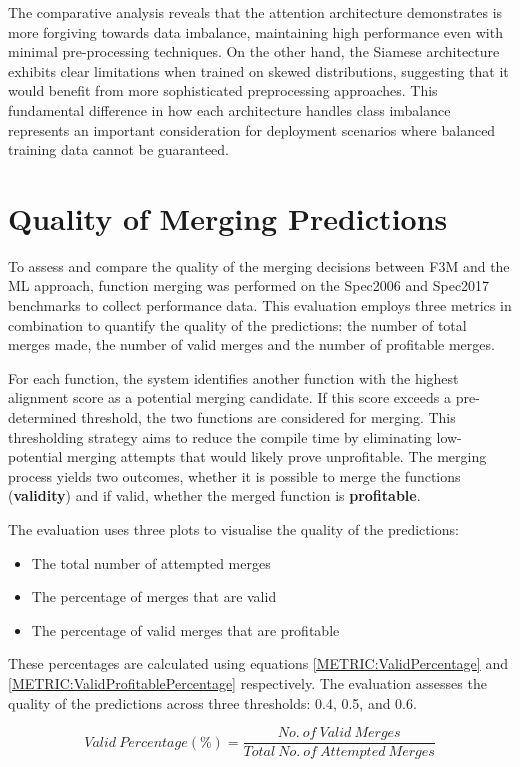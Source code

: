 The comparative analysis reveals that the attention architecture demonstrates is more forgiving towards data imbalance, maintaining high performance even with minimal pre-processing techniques. On the other hand, the Siamese architecture exhibits clear limitations when trained on skewed distributions, suggesting that it would benefit from more sophisticated preprocessing approaches. This fundamental difference in how each architecture handles class imbalance represents an important consideration for deployment scenarios where balanced training data cannot be guaranteed.

\section{Quality of Merging Predictions}
To assess and compare the quality of the merging decisions between F3M and the ML approach, function merging was performed on the Spec2006 and Spec2017 benchmarks to collect performance data. This evaluation employs three metrics in combination to quantify the quality of the predictions: the number of total merges made, the number of valid merges and the number of profitable merges.

For each function, the system identifies another function with the highest alignment score as a potential merging candidate. If this score exceeds a pre-determined threshold, the two functions are considered for merging. This thresholding strategy aims to reduce the compile time by eliminating low-potential merging attempts that would likely prove unprofitable. The merging process yields two outcomes, whether it is possible to merge the functions (\textbf{validity}) and if valid, whether the merged function is \textbf{profitable}. 

The evaluation uses three plots to visualise the quality of the predictions:
\begin{itemize}
    \item The total number of attempted merges
    \item The percentage of merges that are valid
    \item The percentage of valid merges that are profitable
\end{itemize}
These percentages are calculated using equations \ref{METRIC:ValidPercentage} and \ref{METRIC:ValidProfitablePercentage} respectively. The evaluation assesses the quality of the predictions across three thresholds: 0.4, 0.5, and 0.6. 

\begin{equation} \label{METRIC:ValidPercentage}
    Valid\ Percentage(\%) =\frac{No.\ of\ Valid\ Merges}{Total\ No.\ of\ Attempted\ Merges}
\end{equation}

